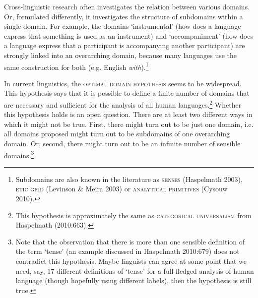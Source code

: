 %
Cross-linguistic research often investigates the relation between various domains. Or, formulated differently, it investigates the structure of subdomains within a single domain.  For example, the domains `instrumental' (how does a language express that something is used as an instrument) and `accompaniment' (how does a language express that a participant is accompanying another participant) are strongly linked into an overarching domain, because many languages use the same construction for both (e.g. English \textit{with}).\footnote{Subdomains are also known in the literature as \textsc{senses} (Haspelmath 2003), \textsc{etic grid} (Levinson \& Meira 2003) or \textsc{analytical primitives} (Cysouw 2010).}

In current linguistics, the \textsc{optimal domain hypothesis} seems to be widespread. This hypothesis says that it is possible to define a finite number of domains that are necessary and sufficient for the analysis of all human languages.\footnote{This hypothesis is approximately the same as \textsc{categorical universalism} from Haspelmath (2010:663).} Whether this hypothesis holds is an open question. There are at least two different ways in which it might not be true. First, there might turn out to be just one domain, i.e. all domains proposed might turn out to be subdomains of one overarching domain. Or, second, there might turn out to be an infinite number of sensible domains.\footnote{Note that the observation that there is more than one sensible definition of the term `tense' (an example discussed in Haspelmath 2010:679) does not contradict this hypothesis. Maybe linguists can agree at some point that we need, say, 17 different definitions of `tense' for a full fledged analysis of human language (though hopefully using different labels), then the hypothesis is still true.}


